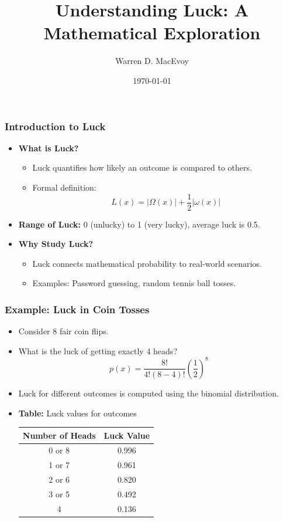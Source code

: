 \documentclass{beamer}
\title{Understanding Luck: A Mathematical Exploration}
\author{Warren D. MacEvoy}
\date{\today}
\begin{document}
\frame{\titlepage}

\begin{frame}
\frametitle{Introduction to Luck}
\begin{itemize}
    \item \textbf{What is Luck?}
        \begin{itemize}
            \item Luck quantifies how likely an outcome is compared to others.
            \item Formal definition: 
            \[L(x) = |\Omega(x)| + \frac{1}{2}|\omega(x)|\]
        \end{itemize}
    \item \textbf{Range of Luck:} 0 (unlucky) to 1 (very lucky), average luck is 0.5.
    \item \textbf{Why Study Luck?}
        \begin{itemize}
            \item Luck connects mathematical probability to real-world scenarios.
            \item Examples: Password guessing, random tennis ball tosses.
        \end{itemize}
\end{itemize}
\end{frame}

\begin{frame}
\frametitle{Example: Luck in Coin Tosses}
\begin{itemize}
    \item Consider 8 fair coin flips.
    \item What is the luck of getting exactly 4 heads?
    \[
    p(x) = \frac{8!}{4!(8-4)!} \left( \frac{1}{2} \right)^8
    \]
    \item Luck for different outcomes is computed using the binomial distribution.
    \item \textbf{Table:} Luck values for outcomes
    \begin{center}
    \begin{tabular}{|c|c|}
    \hline
    Number of Heads & Luck Value \\
    \hline
    0 or 8 & 0.996 \\
    1 or 7 & 0.961 \\
    2 or 6 & 0.820 \\
    3 or 5 & 0.492 \\
    4 & 0.136 \\
    \hline
    \end{tabular}
    \end{center}
\end{itemize}
\end{frame}
\end{document}
